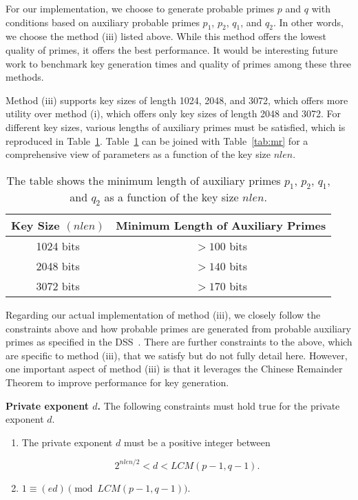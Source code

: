\documentclass[a4paper]{article}
\begin{document}
For our implementation, we choose to generate probable primes $p$ and $q$ with conditions based on auxiliary probable primes $p_1$, $p_2$, $q_1$, and $q_2$. In other words, we choose the method (iii) listed above. While this method offers the lowest quality of primes, it offers the best performance. It would be interesting future work to benchmark key generation times and quality of primes among these three methods.

Method (iii) supports key sizes of length 1024, 2048, and 3072, which offers more utility over method (i), which offers only key sizes of length 2048 and 3072. For different key sizes, various lengths of auxiliary primes must be satisfied, which is reproduced in Table~\ref{tab:aux_len}. Table~\ref{tab:aux_len} can be joined with Table~\ref{tab:mr} for a comprehensive view of parameters as a function of the key size $nlen$.

\begin{table}[h]
\centering
\begin{tabular}{|c|c|} 
 \hline
 Key Size $(nlen)$ & Minimum Length of Auxiliary Primes\\ \hline
 1024 bits & $> 100$ bits \\ 
 2048 bits & $> 140$ bits \\ 
 3072 bits & $> 170$ bits \\
 \hline
\end{tabular}
\caption{The table shows the minimum length of auxiliary primes $p_1$, $p_2$, $q_1$, and $q_2$ as a function of the key size $nlen$.}
\label{tab:aux_len}
\end{table}

Regarding our actual implementation of method (iii), we closely follow the constraints above and how probable primes are generated from probable auxiliary primes as specified in the DSS~\cite{fips2013186}. There are further constraints to the above, which are specific to method (iii), that we satisfy but do not fully detail here. However, one important aspect of method (iii) is that it leverages the Chinese Remainder Theorem to improve performance for key generation.\newline

\noindent \textbf{Private exponent $d$.} The following constraints must hold true for the private exponent $d$.

\begin{enumerate}
    \item The private exponent $d$ must be a positive integer between

        \begin{equation}
            2^{nlen/2} < d < LCM(p-1,q-1).
        \end{equation}

    \item $1 \equiv (ed) \pmod{LCM(p-1,q-1)}$.
\end{enumerate}
\end{document}
